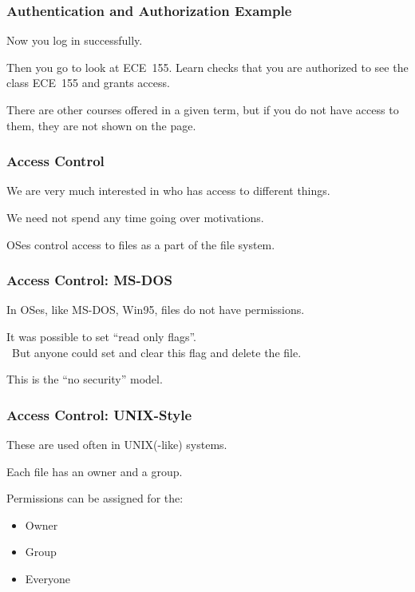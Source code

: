 \begin{frame}
\frametitle{Authentication and Authorization Example}
\begin{changemargin}{1cm}

Now you log in successfully.

Then you go to look at ECE~155. Learn checks that you are authorized to see the class ECE~155 and grants access. 

There are other courses offered in a given term, but if you do not have access to them, they are not shown on the page.

\end{changemargin}
\end{frame}

\begin{frame}
\frametitle{Access Control}
\begin{changemargin}{1cm}

We are very much interested in who has access to different things.

We need not spend any time going over motivations.

OSes control access to files as a part of the file system.

\end{changemargin}
\end{frame}

\begin{frame}
\frametitle{Access Control: MS-DOS}
\begin{changemargin}{1cm}

In OSes, like MS-DOS, Win95, files do not have permissions.

It was possible to set ``read only flags''.\\\
\quad But anyone could set and clear this flag and delete the file.

This is the ``no security'' model.

\end{changemargin}
\end{frame}

\begin{frame}
\frametitle{Access Control: UNIX-Style}
\begin{changemargin}{1cm}

These are used often in UNIX(-like) systems.

Each file has an owner and a group. 

Permissions can be assigned for the:
\begin{itemize}
	\item Owner
	\item Group
	\item Everyone
\end{itemize}

\end{changemargin}
\end{frame}

